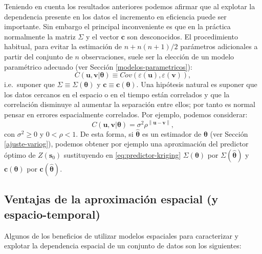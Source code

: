 \documentclass[
  spanish,
]{book}
\theoremstyle{break}
\theoremstyle{definition}
\theoremstyle{definition}
\theoremstyle{definition}
\theoremstyle{definition}
\theoremstyle{remark}
\begin{document}
Teniendo en cuenta los resultados anteriores podemos afirmar que al explotar la dependencia presente en los datos el incremento en eficiencia puede ser importante.
Sin embargo el principal inconveniente es que en la práctica normalmente la matriz \(\Sigma\) y el vector \(\mathbf{c}\) son desconocidos.
El procedimiento habitual, para evitar la estimación de \(n+n(n+1)/2\) parámetros adicionales a partir del
conjunto de \(n\) observaciones, suele ser la elección de un modelo paramétrico adecuado (ver Sección \ref{modelos-parametricos}):
\[C(\mathbf{u},\mathbf{v}\left| \boldsymbol{\theta}\right. )\equiv Cov\left( \varepsilon (\mathbf{u}),\varepsilon (\mathbf{v})\right),\]
i.e.~suponer que \(\Sigma \equiv \Sigma\left( \boldsymbol{\theta}\right)\) y \(\mathbf{c}\equiv \mathbf{c}\left( \boldsymbol{\theta}\right)\).
Una hipótesis natural es suponer que los datos cercanos en el espacio o en el tiempo están correlados y que la correlación disminuye al aumentar la separación entre ellos; por tanto es normal pensar en errores espacialmente correlados.
Por ejemplo, podemos considerar:
\[C(\mathbf{u},\mathbf{v}\left| \boldsymbol{\theta}\right. )=\sigma^{2} \rho^{\left\| \mathbf{u}-\mathbf{v}\right\| },\]
con \(\sigma^{2} \geq 0\) y \(0<\rho <1\).
De esta forma, si \(\hat{\boldsymbol{\theta}}\) es un estimador de \(\boldsymbol{\theta}\) (ver Sección \ref{ajuste-variog}), podemos obtener por ejemplo una aproximación del predictor óptimo de \(Z(\mathbf{s}_{0} )\) sustituyendo en \eqref{eq:predictor-kriging} \(\Sigma(\boldsymbol{\theta})\) por \(\Sigma(\hat{\boldsymbol{\theta}} )\) y \(\mathbf{c}(\boldsymbol{\theta})\) por \(\mathbf{c}(\hat{\boldsymbol{\theta}} )\).

\hypertarget{ventajas-de-la-aproximaciuxf3n-espacial-y-espacio-temporal}{%
\subsection{Ventajas de la aproximación espacial (y espacio-temporal)}\label{ventajas-de-la-aproximaciuxf3n-espacial-y-espacio-temporal}}

Algunos de los beneficios de utilizar modelos espaciales para caracterizar y explotar la dependencia espacial de un conjunto de datos son los siguientes:
\end{document}
